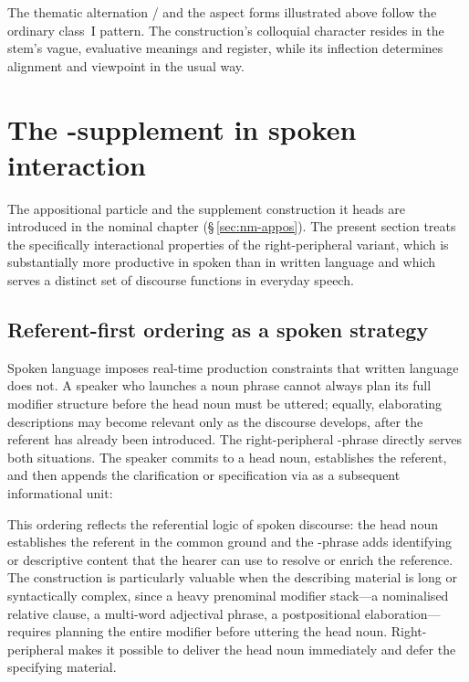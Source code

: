 The thematic alternation / and the aspect forms
illustrated above follow the ordinary class~I pattern. The construction's
colloquial character resides in the stem's vague, evaluative meanings and
register, while its inflection determines alignment and viewpoint in the
usual way.

\section{The -supplement in spoken interaction}
\label{sec:spoken-ty}

The appositional particle  and the supplement construction it heads
are introduced in the nominal chapter (\S\,\ref{sec:nm-appos}). The present
section treats the specifically interactional properties of the
right-peripheral variant, which is substantially more productive in spoken
than in written language and which serves a distinct set of discourse functions
in everyday speech.

\subsection{Referent-first ordering as a spoken strategy}
\label{sec:spoken-ty-strategy}

Spoken language imposes real-time production constraints that written language
does not. A speaker who launches a noun phrase cannot always plan its full
modifier structure before the head noun must be uttered; equally, elaborating
descriptions may become relevant only as the discourse develops, after the
referent has already been introduced. The right-peripheral -phrase
directly serves both situations. The speaker commits to a head noun,
establishes the referent, and then appends the clarification or specification
via  as a subsequent informational unit:

\pex
\a {}
\a {}
\a {}
\xe

\noindent This ordering reflects the referential logic of spoken discourse: the
head noun establishes the referent in the common ground and the -phrase
adds identifying or descriptive content that the hearer can use to resolve or
enrich the reference. The construction is particularly valuable when the
describing material is long or syntactically complex, since a heavy prenominal
modifier stack---a nominalised relative clause, a multi-word adjectival phrase,
a postpositional elaboration---requires planning the entire modifier before
uttering the head noun. Right-peripheral  makes it possible to deliver
the head noun immediately and defer the specifying material.

